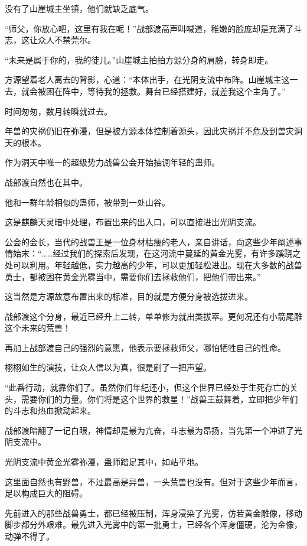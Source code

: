 \begin{this_body}
没有了山崖城主坐镇，他们就缺乏底气。

“师父，你放心吧，这里有我在呢！”战部渡高声叫喊道，稚嫩的脸庞却是充满了斗志，这让众人不禁莞尔。

“未来是属于你的，我的徒儿。”山崖城主拍拍方源分身的肩膀，转身即走。

方源望着老人离去的背影，心道：“本体出手，在光阴支流中布阵。山崖城主这一去，就会被困在阵中，等待我的拯救。舞台已经搭建好，就差我这个主角了。”

时间匆匆，数月转瞬就过去。

年兽的灾祸仍旧在弥漫，但是被方源本体控制着源头，因此灾祸并不危及到兽灾洞天的根本。

作为洞天中唯一的超级势力战兽公会开始抽调年轻的蛊师。

战部渡自然也在其中。

他和一群年龄相似的蛊师，被带到一处山谷。

这是麒麟天灵暗中处理，布置出来的出入口，可以直接进出光阴支流。

公会的会长，当代的战兽王是一位身材枯瘦的老人，亲自讲话，向这些少年阐述事情始末：“……经过我们的探索后发现，在这河流中蔓延的黄金光雾，有许多蹊跷之处可以利用。年轻越低，实力越高的少年，可以更加轻松进出。现在大多数的战兽勇士，都被困在黄金光雾当中，需要你们去拯救他们，把他们带出来。”

这当然是方源故意布置出来的标准，目的就是方便分身被选拔进来。

战部渡这个分身，最近已经升上二转，单单修为就出类拔萃。更何况还有小箭尾雕这个未来的荒兽！

再加上战部渡自己的强烈的意愿，他表示要拯救师父，哪怕牺牲自己的性命。

栩栩如生的演技，让众人信以为真，很是刷了一把声望。

“此番行动，就靠你们了。虽然你们年纪还小，但这个世界已经处于生死存亡的关头，需要你们的力量。你们将是这个世界的救星！”战兽王鼓舞着，立即把少年们的斗志和热血掀动起来。

战部渡暗翻了一记白眼，神情却是最为亢奋，斗志最为昂扬，当先第一个冲进了光阴支流中。

光阴支流中黄金光雾弥漫，蛊师踏足其中，如站平地。

这里面自然也有野兽，不过最高是异兽，一头荒兽也没有。但对于这些少年而言，足以构成巨大的阻碍。

先前进入的那些战兽勇士，都已经被压制，浑身浸染了光雾，仿若黄金雕像，移动脚步都分外艰难。最先进入光雾中的第一批勇士，已经各个浑身僵硬，沦为金像，动弹不得了。


\end{this_body}
